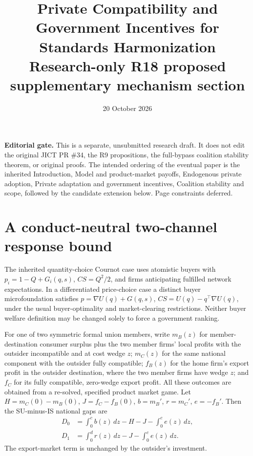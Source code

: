 \documentclass[11pt]{article}
\title{Private Compatibility and Government Incentives for Standards Harmonization\\
\large Research-only R18 proposed supplementary mechanism section}
\date{20 October 2026}
\begin{document}
\maketitle
\noindent\textbf{Editorial gate.} This is a separate, unsubmitted research draft. It does not edit the original JICT PR \#34, the R9 propositions, the full-bypass coalition stability theorem, or original proofs. The intended ordering of the eventual paper is the inherited Introduction, Model and product-market payoffs, Endogenous private adoption, Private adaptation and government incentives, Coalition stability and scope, followed by the candidate extension below. Page constraints deferred.

\section{A conduct-neutral two-channel response bound}
The inherited quantity-choice Cournot case uses atomistic buyers with
\(p_i=1-Q+G_i(q,s)\), \(CS=Q^2/2\), and firms anticipating fulfilled
network expectations. In a differentiated price-choice case a distinct
buyer microfoundation satisfies \(p=\nabla U(q)+G(q,s)\),
\(CS=U(q)-q^\top\nabla U(q)\), under the usual buyer-optimality
and market-clearing restrictions. Neither buyer welfare definition may be
changed solely to force a government ranking.

For one of two symmetric formal union members, write
\(m_B(z)\) for member-destination consumer surplus plus the two member
firms' local profits with the outsider incompatible and at cost wedge
\(z\); \(m_C(z)\) for the same national component with the outsider
fully compatible; \(f_B(z)\) for the home firm's export profit in the
outsider destination, where the two member firms have wedge \(z\);
and \(f_C\) for its fully compatible, zero-wedge export profit.
All these outcomes are obtained from a re-solved, specified product
market game. Let \(H=m_C(0)-m_B(0)\), \(J=f_C-f_B(0)\),
\(b=m_B'\), \(r=m_C'\), \(e=-f_B'\).
Then the SU-minus-IS national gaps are
\begin{align}
D_0&=\int_0^c b(z)\,dz-H-J-\int_0^c e(z)\,dz,\\
D_1&=\int_0^d r(z)\,dz-J-\int_0^c e(z)\,dz.
\end{align}
The export-market term is unchanged by the outsider's investment.
\end{document}
